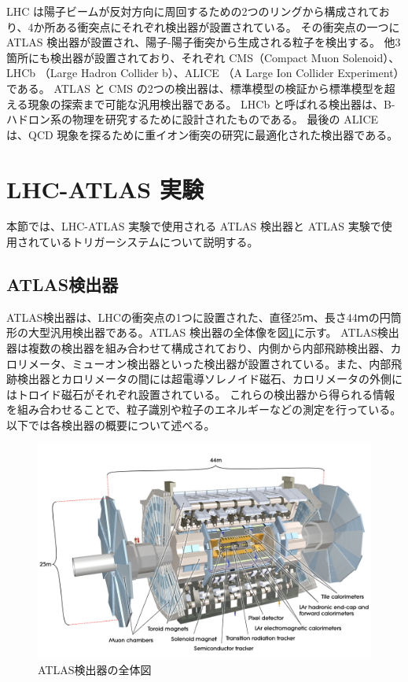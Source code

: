 LHC は陽子ビームが反対方向に周回するための2つのリングから構成されており、4か所ある衝突点にそれぞれ検出器が設置されている。
その衝突点の一つに　ATLAS 検出器が設置され、陽子-陽子衝突から生成される粒子を検出する。
他3箇所にも検出器が設置されており、それぞれ CMS（Compact Muon Solenoid）、LHCb （Large Hadron Collider b）、ALICE （A Large Ion Collider Experiment）である。
ATLAS と CMS の2つの検出器は、標準模型の検証から標準模型を超える現象の探索まで可能な汎用検出器である。
LHCb と呼ばれる検出器は、B-ハドロン系の物理を研究するために設計されたものである。
最後の ALICE は、QCD 現象を探るために重イオン衝突の研究に最適化された検出器である。


\section{LHC-ATLAS 実験}\label{section2-2}
本節では、LHC-ATLAS 実験で使用される ATLAS 検出器と ATLAS 実験で使用されているトリガーシステムについて説明する。

\subsection{ATLAS検出器}
ATLAS検出器は、LHCの衝突点の1つに設置された、直径25ｍ、長さ44ｍの円筒形の大型汎用検出器である。ATLAS 検出器の全体像を図\ref{fig:ATLAS検出器}に示す。
ATLAS検出器は複数の検出器を組み合わせて構成されており、内側から内部飛跡検出器、カロリメータ、ミューオン検出器といった検出器が設置されている。また、内部飛跡検出器とカロリメータの間には超電導ソレノイド磁石、カロリメータの外側にはトロイド磁石がそれぞれ設置されている。
これらの検出器から得られる情報を組み合わせることで、粒子識別や粒子のエネルギーなどの測定を行っている。
以下では各検出器の概要について述べる。

\begin{figure}[tb]
  \centering
  \includegraphics[clip,width=14cm]{fig/2/0803012_01.jpg}
  \caption{ATLAS検出器の全体図}
  \label{fig:ATLAS検出器}
\end{figure}

